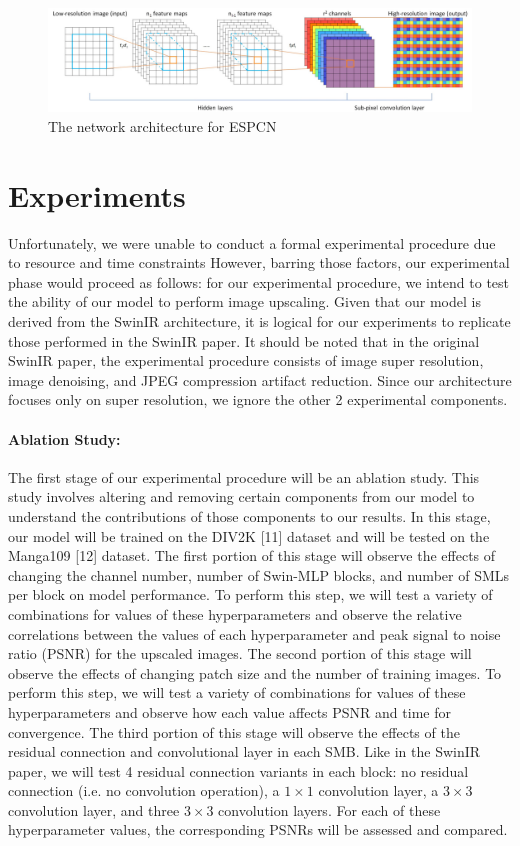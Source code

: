 \documentclass{article}
\begin{document}
\begin{figure}\label{fig:escpn}
    \centering
    \includegraphics[width=\textwidth]{espcn.png}
    \caption{The network architecture for ESPCN}
\end{figure}

\section{Experiments}

Unfortunately, we were unable to conduct a formal experimental procedure due to resource and time constraints However, barring those factors, our experimental phase would proceed as follows: for our experimental procedure, we intend to test the ability of our model to perform image upscaling. Given that our model is derived from the SwinIR architecture, it is logical for our experiments to replicate those performed in the SwinIR paper. It should be noted that in the original SwinIR paper, the experimental procedure consists of image super resolution, image denoising, and JPEG compression artifact reduction. Since our architecture focuses only on super resolution, we ignore the other 2 experimental components.

\paragraph{Ablation Study:} The first stage of our experimental procedure will be an ablation study. This study involves altering and removing certain components from our model to understand the contributions of those components to our results. In this stage, our model will be trained on the DIV2K [11] dataset and will be tested on the Manga109 [12] dataset. The first portion of this stage will observe the effects of changing the channel number, number of Swin-MLP blocks, and number of SMLs per block on model performance. To perform this step, we will test a variety of combinations for values of these hyperparameters and observe the relative correlations between the values of each hyperparameter and peak signal to noise ratio (PSNR) for the upscaled images. The second portion of this stage will observe the effects of changing patch size and the number of training images. To perform this step, we will test a variety of combinations for values of these hyperparameters and observe how each value affects PSNR and time for convergence. The third portion of this stage will observe the effects of the residual connection and convolutional layer in each SMB. Like in the SwinIR paper, we will test 4 residual connection variants in each block: no residual connection (i.e. no convolution operation), a $1 \times 1$ convolution layer, a $3 \times 3$ convolution layer, and three $3 \times 3$ convolution layers. For each of these hyperparameter values, the corresponding PSNRs will be assessed and compared.
\end{document}
